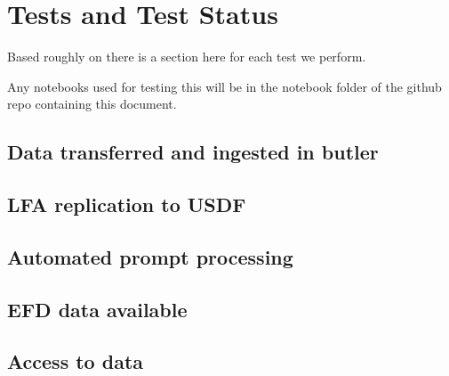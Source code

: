 \section{Tests and Test Status} \label{sec:testing}
Based roughly on  there is a section here for each test we perform.

Any notebooks used for testing this will be in the notebook folder of the github repo containing this document.

\subsection{Data transferred and ingested in butler }

\subsection{LFA replication to USDF }
\subsection{Automated prompt processing}
\subsection{EFD data available }
\subsection{Access to data}

